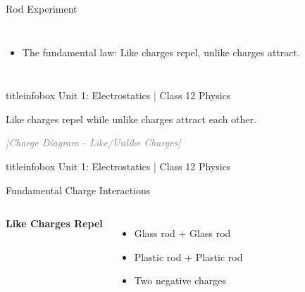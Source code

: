 \begin{frame}
\begin{frame}{Rod Experiment}
\begin{columns}
\begin{itemize}
            \item The fundamental law: Like charges repel, unlike charges attract.
        \end{itemize}
    \end{columns}
    
    \vfill
    
    \begin{beamercolorbox}[wd=\textwidth,ht=0.5cm,dp=0.1cm,center]{titleinfobox}
        \small\color{coolgray} Unit 1: Electrostatics | Class 12 Physics
    \end{beamercolorbox}
\end{frame}

\begin{frame}{Like charges repel while unlike charges attract each other.}
    \vspace{0.2cm}
    
    \begin{center}
        \textcolor{gray}{\textit{[Charge Diagram - Like/Unlike Charges]}}
    \end{center}
    
    \vfill
    
    \begin{beamercolorbox}[wd=\textwidth,ht=0.5cm,dp=0.1cm,center]{titleinfobox}
        \small\color{coolgray} Unit 1: Electrostatics | Class 12 Physics
    \end{beamercolorbox}
\end{frame}
\begin{frame}{Fundamental Charge Interactions}
    \begin{columns}
        \centering
        \familiar{\Huge\faPlus\faPlus}
        
        \vspace{0.5cm}
        
        \textbf{Like Charges Repel}
        
        \vspace{0.5cm}
        
        \begin{itemize}
        \item Glass rod + Glass rod
            \item Plastic rod + Plastic rod
            \item Two negative charges
        \end{itemize}
        

\end{columns}
\end{frame}
\end{frame}
